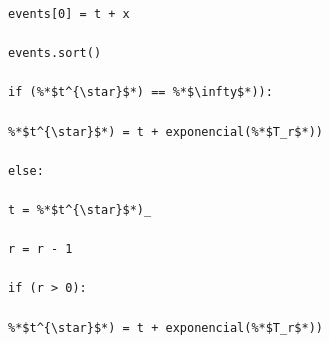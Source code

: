 \documentclass[10pt,a4paper]{article} %
\begin{document}
\begin{lstlisting}[caption=Funciones auxiliares.]
                                                                                                                                                                                                                                                events[0] = t + x
                                                                                                                                                                                                                                                            events.sort()
                                                                                                                                                                                                                                                                        if (%*$t^{\star}$*) == %*$\infty$*)):
                                                                                                                                                                                                                                                                                            %*$t^{\star}$*) = t + exponencial(%*$T_r$*))
                                                                                                                                                                                                                                                                                                else: 
                                                                                                                                                                                                                                                                                                            t = %*$t^{\star}$*)_
                                                                                                                                                                                                                                                                                                                    r = r - 1
                                                                                                                                                                                                                                                                                                                            if (r > 0):
                                                                                                                                                                                                                                                                                                                                            %*$t^{\star}$*) = t + exponencial(%*$T_r$*))

\end{lstlisting}
\end{document}
